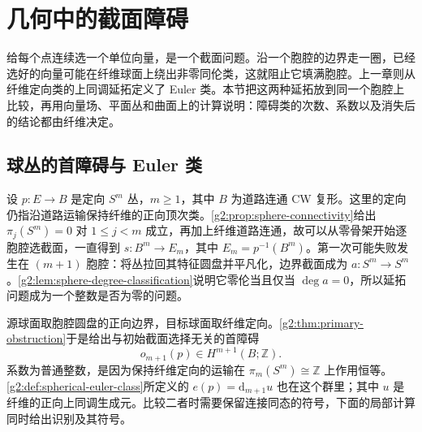 
% 
% 
% 

\section{几何中的截面障碍}
\label{g2:sec:1204}

给每个点连续选一个单位向量，是一个截面问题。沿一个胞腔的边界走一圈，已经选好的向量可能在纤维球面上绕出非零同伦类，这就阻止它填满胞腔。上一章则从纤维定向类的上同调延拓定义了 Euler 类。本节把这两种延拓放到同一个胞腔上比较，再用向量场、平面丛和曲面上的计算说明：障碍类的次数、系数以及消失后的结论都由纤维决定。

\subsection{球丛的首障碍与 Euler 类}
\label{g2:subsec:1204:01}
设 \(p:E\rightarrow B\) 是定向 \(S^m\) 丛，\(m\ge1\)，其中 \(B\) 为道路连通 CW 复形。这里的定向仍指沿道路运输保持纤维的正向顶次类。\cref{g2:prop:sphere-connectivity}给出 \(\pi_j(S^m)=0\) 对 \(1\le j<m\) 成立，再加上纤维道路连通，故可以从零骨架开始逐胞腔选截面，一直得到 \(s:B^m\rightarrow E_m\)，其中 \(E_m=p^{-1}(B^m)\)。第一次可能失败发生在 \((m+1)\) 胞腔：将丛拉回其特征圆盘并平凡化，边界截面成为 \(a:S^m\rightarrow S^m\)。\cref{g2:lem:sphere-degree-classification}说明它零伦当且仅当 \(\deg a=0\)，所以延拓问题成为一个整数是否为零的问题。

\ProseParagraphBreak

源球面取胞腔圆盘的正向边界，目标球面取纤维定向。\cref{g2:thm:primary-obstruction}于是给出与初始截面选择无关的首障碍
\[
	o_{m+1}(p)\in H^{m+1}(B;\mathbb Z).
\]
系数为普通整数，是因为保持纤维定向的运输在 \(\pi_m(S^m)\cong\mathbb Z\) 上作用恒等。\cref{g2:def:spherical-euler-class}所定义的 \(e(p)=\mathrm d_{m+1}u\) 也在这个群里；其中 \(u\) 是纤维的正向上同调生成元。比较二者时需要保留连接同态的符号，下面的局部计算同时给出识别及其符号。

